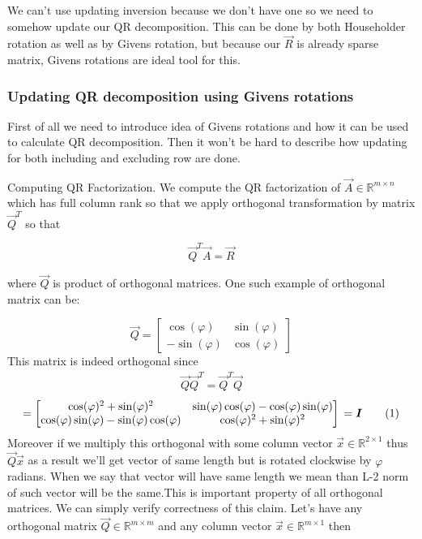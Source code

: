 We can't use updating inversion because we don't have one so we need to somehow update our QR decomposition. This can be done by both Householder rotation as well as by Givens rotation, but because our $\vec{R}$ is already sparse matrix, Givens rotations are ideal tool for this.

\subsubsection{Updating QR decomposition using Givens rotations}
First of all we need to introduce idea of Givens rotations and how it can be used to calculate QR decomposition. Then it won't be hard to describe how updating for both including and excluding row are done.

Computing QR Factorization.
We compute the QR factorization of $\vec{A} \in \mathbb{R}^{m \times n}$ which has full column rank so that we apply orthogonal transformation by matrix $\vec{Q}^T$ so that \cite{hammarling2008updatingqr}

\begin{equation}
	\vec{Q}^T\vec{A} = \vec{R}
\end{equation}
 
where $\vec{Q}$ is product of orthogonal matrices. One such example of orthogonal matrix can be:

\begin{equation} \label{givensmatrix}
\vec{Q} = 
\begin{bmatrix} 
\cos(\varphi) & \sin(\varphi) \\
- \sin(\varphi) & \cos(\varphi)
\end{bmatrix}
\end{equation}
This matrix is indeed orthogonal since 
\begin{align*} 
\vec{Q}\vec{Q}^T = \vec{Q}^T\vec{Q}    
\end{align*}
 \begin{equation*}
	= \begin{bmatrix} 
		\cos(\varphi)^2 + \sin(\varphi)^2  & \sin(\varphi)\cos(\varphi) - \cos(\varphi)\sin(\varphi) \\
		\cos(\varphi)\sin(\varphi) - \sin(\varphi)\cos(\varphi) & \cos(\varphi)^2 + \sin(\varphi)^2
	\end{bmatrix} \\ = \vec{I}
	\numberthis
\end{equation*}
Moreover if we multiply this orthogonal with some column vector $\vec{x} \in \mathbb{R}^{2 \times 1}$ thus $\vec{Q}\vec{x}$ as a result we'll get vector of same length but is rotated clockwise by  $\varphi$ radians. When we say that vector will have same length we mean than L-2 norm of such vector will be the same.This is important property of all orthogonal matrices. We can simply verify correctness of this claim. Let's have any orthogonal matrix $\vec{Q} \in \mathbb{R}^{m \times m}$ and any column vector $\vec{x} \in  \mathbb{R}^{m \times 1}$ then

